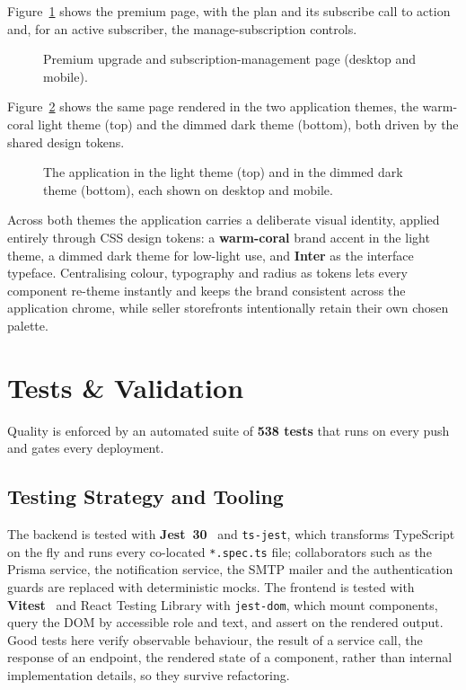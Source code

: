 Figure~\ref{fig:real-upgrade} shows the premium page, with the plan and
its subscribe call to action and, for an active subscriber, the
manage-subscription controls.

\begin{figure}[H]
  \centering
  \caption{Premium upgrade and subscription-management page (desktop and mobile).}
  \label{fig:real-upgrade}
\end{figure}

Figure~\ref{fig:real-theme} shows the same page rendered in the two
application themes, the warm-coral light theme (top) and the dimmed dark
theme (bottom), both driven by the shared design tokens.

\begin{figure}[H]
  \centering
  \caption{The application in the light theme (top) and in the dimmed dark theme (bottom), each shown on desktop and mobile.}
  \label{fig:real-theme}
\end{figure}

\clearpage
Across both themes the application carries a deliberate visual identity,
applied entirely through CSS design tokens: a \textbf{warm-coral} brand
accent in the light theme, a dimmed dark theme for low-light use, and
\textbf{Inter} as the interface typeface. Centralising colour, typography
and radius as tokens lets every component re-theme instantly and keeps the
brand consistent across the application chrome, while seller storefronts
intentionally retain their own chosen palette.

\section{Tests \& Validation}
\label{sec:tests}

Quality is enforced by an automated suite of \textbf{538 tests} that runs
on every push and gates every deployment.

\subsection{Testing Strategy and Tooling}

The backend is tested with \textbf{Jest~30}~\cite{jest} and \texttt{ts-jest}, which
transforms TypeScript on the fly and runs every co-located
\texttt{*.spec.ts} file; collaborators such as the Prisma service, the
notification service, the SMTP mailer and the authentication guards are
replaced with deterministic mocks. The frontend is tested with
\textbf{Vitest}~\cite{vitest} and React Testing Library with \texttt{jest-dom}, which
mount components, query the DOM by accessible role and text, and assert
on the rendered output. Good tests here verify observable behaviour, 
the result of a service call, the response of an endpoint, the rendered
state of a component, rather than internal implementation details, so
they survive refactoring.

